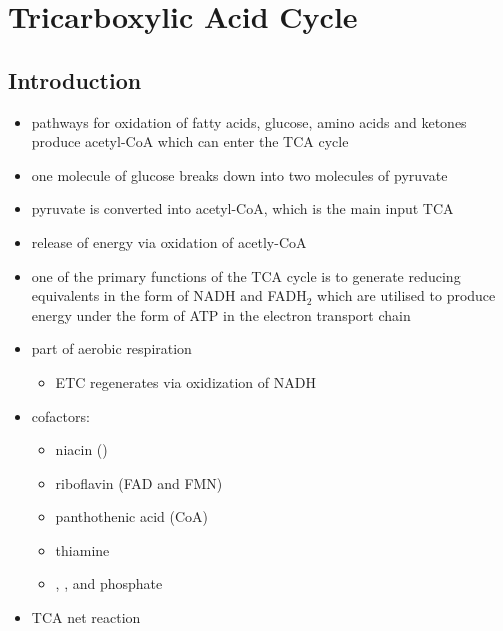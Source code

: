 \documentclass{scrartcl}
\begin{document}
\section{Tricarboxylic Acid Cycle}
\label{sec:org31a8e3b}
\subsection{Introduction}
\label{sec:org9a5f75b}
\begin{itemize}
\item pathways for oxidation of fatty acids, glucose, amino acids and
ketones produce acetyl-CoA which can enter the TCA cycle
\item one molecule of glucose breaks down into two molecules of pyruvate
\item pyruvate is converted into acetyl-CoA, which is the main input TCA
\item release of energy via oxidation of acetly-CoA
\item one of the primary functions of the TCA cycle is to generate
reducing equivalents in the form of NADH and FADH\(_{\text{2}}\) which are
utilised to produce energy under the form of ATP in the electron
transport chain
\end{itemize}

\centering
{}
\begin{itemize}
\item part of aerobic respiration
\begin{itemize}
\item ETC regenerates  via oxidization of NADH
\end{itemize}
\item cofactors:
\begin{itemize}
\item niacin ()
\item riboflavin (FAD and FMN)
\item panthothenic acid (CoA)
\item thiamine
\item {}, ,  and phosphate
\end{itemize}

\item TCA net reaction
\end{itemize}
\end{document}
